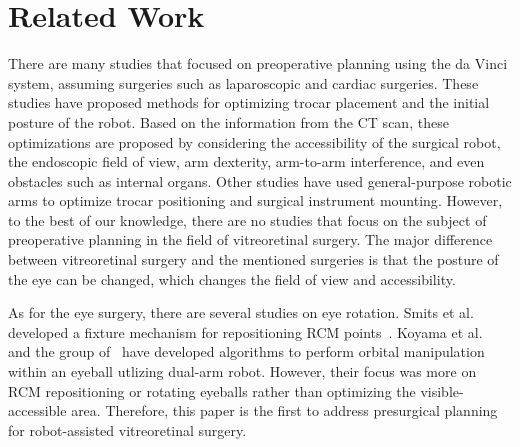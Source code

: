 \section{Related Work}
There are many studies that focused on preoperative planning using the da Vinci system, assuming surgeries such as laparoscopic and cardiac surgeries\cite{davincipreoperative1,davincipreoperative2,davincipreoperative3,davincipreoperative4,davincipreoperative5,davincipreoperative6,davincipreoperative7}. These studies have proposed methods for optimizing trocar placement and the initial posture of the robot. Based on the information from the CT scan, these optimizations are proposed by considering the accessibility of the surgical robot, the endoscopic field of view, arm dexterity, arm-to-arm interference, and even obstacles such as internal organs. Other studies have used general-purpose robotic arms to optimize trocar positioning and surgical instrument mounting\cite{trocaroptimization1,trocaroptimization2,trocaroptimization3}.
However, to the best of our knowledge, there are no studies that focus on the subject of preoperative planning in the field of vitreoretinal surgery. The major difference between vitreoretinal surgery and the mentioned surgeries is that the posture of the eye can be changed, which changes the field of view and accessibility. 

As for the eye surgery, there are several studies on eye rotation.
Smits et al. developed a fixture mechanism for repositioning RCM points~\cite {KUlevensetupandmethod}. Koyama et al.~\cite{Koyama} and the group of~\cite{weidesign,weiperformance,haorandesign} have developed algorithms to perform orbital manipulation within an eyeball utlizing dual-arm robot. However, their focus was more on RCM repositioning or rotating eyeballs rather than optimizing the visible-accessible area.
Therefore, this paper is the first to address presurgical planning for robot-assisted vitreoretinal surgery.